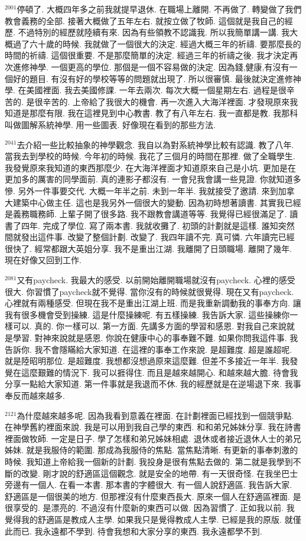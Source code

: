 \documentclass{book}
\begin{document}
$^{2001}$停頓了.
大概四年多之前我就提早退休.
在職場上離開.
不再做了.
轉變做了我們教會義務的全部.
接著大概做了五年左右.
就按立做了牧師.
這個就是我自己的經歷.
不過特別的經歷就陸續有來.
因為有些領教不認識我.
所以我簡單講一講.
我大概過了六十歲的時候.
我就做了一個很大的決定.
經過大概三年的祈禱.
要那麼長的時間的祈禱.
這個很重要.
不是那麼簡單的決定.
經過三年的祈禱之後.
我才決定再次進修神學.
一個更高的學位.
那個是一個不容易做的決定.
因為錢,健康,有沒有一個好的題目.
有沒有好的學校等等的問題就出現了.
所以很審慎.
最後就決定進修神學.
在美國裡面.
我去美國修課.
一年去兩次.
每次大概一個星期左右.
過程是很辛苦的.
是很辛苦的.
上帝給了我很大的機會.
再一次進入大海洋裡面.
才發現原來我知道是那麼有限.
我在這裡見到中心教書.
教了有八年左右.
我一直都是教.
我那科叫做圖解系統神學.
用一些圖表.
好像現在看到的那些方法.

$^{2041}$去介紹一些比較抽象的神學觀念.
我自以為對系統神學比較有認識.
教了八年.
當我去到學校的時候.
今年初的時候.
我花了三個月的時間在那裡.
做了全職學生.
我發覺原來我知道的東西那麼少.
在大海洋裡面才知道原來自己是小坑.
更加是在更加多的厲害的同學面前.
真的連影子都沒有.
一會兒我會講一些見證.
你就知道多慘.
另外一件事要交代.
大概一年半之前.
未到一年半.
我就接受了邀請.
來到加拿大建築中心做主任.
這也是我另外一個很大的變動.
因為初時想著讀書.
其實我已經是義務職務師.
上輩子開了很多路.
我不跟教會講道等等.
我覺得已經很滿足了.
讀書了四年.
完成了學位.
寫了兩本書.
我就收攤了.
初頭的計劃就是這樣.
誰知突然間就發出這件事.
改變了整個計劃.
改變了.
我四年讀不完.
真可憐.
六年讀完已經很快了.
經常都跟大英姐分享.
我不是重出江湖.
我離開了日頭職場.
離開了幾年.
現在好像又回到工作.

$^{2081}$又有paycheck.
我最大的感受.
以前開始離開職場就沒有paycheck.
心裡的感受很大.
你習慣了paycheck就不覺得.
當你沒有的時候就很覺得.
現在又有paycheck.
心裡就有兩種感受.
但現在我不是重出江湖上班.
而是我重新調動我的事奉方向.
讓我有很多機會受到操練.
這是什麼操練呢.
有五樣操練.
我告訴大家.
這些操練你一樣可以.
真的.
你一樣可以.
第一方面.
先講多方面的學習和感恩.
對我自己來說就是學習.
對神來說就是感恩.
你說在健康中心的事奉難不難.
如果你問我這件事.
我告訴你.
我不會隱瞞給大家知道.
在這裡的事奉工作來說.
是超難度.
超是誰超呢.
就是陸昭明那位.
是超難度.
我想都沒想過原來這麼難.
但差不多接近一年半.
我發覺在這麼艱難的情況下.
我可以捱得住.
而且是越來越開心.
和越來越大膽.
待會我分享一點給大家知道.
第一件事就是我退而不休.
我的經歷就是在逆場退下來.
我事奉反而越來越多.

$^{2121}$為什麼越來越多呢.
因為我看到意義在裡面.
在計劃裡面已經找到一個競爭點.
在神學舊約裡面來說.
我是可以用到我自己學的東西.
和和弟兄姊妹分享.
我在詩書裡面做牧師.
一定是日子.
學了怎樣和弟兄姊妹相處.
退休或者接近退休人士的弟兄姊妹.
就是我服侍的範圍.
那成為我服侍的焦點.
當焦點清晰.
有更新的事奉刺激的時候.
我知道上帝給我一個新的計劃.
我投身是很有焦點去做的.
第二就是我學到不斷的改變.
剛才說的舒適區這個觀念.
就是安全的地帶.
有一天很奇怪.
在我坐巴士旁邊有一個人.
在看一本書.
那本書的字體很大.
有一個人說舒適區.
我告訴大家.
舒適區是一個很美的地方.
但那裡沒有什麼東西長大.
原來一個人在舒適區裡面.
是很享受的.
是漂亮的.
不過沒有什麼新的東西可以做.
因為習慣了.
正如我以前.
我覺得我的舒適區是教成人主學.
如果我只是覺得教成人主學.
已經是我的原版.
就僅此而已.
我永遠都不學到.
待會我想和大家分享的東西.
我永遠都學不到.
\end{document}
